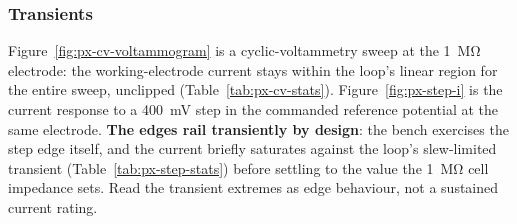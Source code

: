 %

\subsubsection{Transients}\label{sss:pixel-transient}

Figure~\ref{fig:px-cv-voltammogram} is a cyclic-voltammetry sweep at the
\SI{1}{\mega\ohm} electrode: the working-electrode current stays within the
loop's linear region for the entire sweep, unclipped
(Table~\ref{tab:px-cv-stats}). Figure~\ref{fig:px-step-i} is the current
response to a \SI{400}{\milli\volt} step in the commanded reference potential
at the same electrode. \textbf{The edges rail transiently by design}: the
bench exercises the step edge itself, and the current briefly saturates
against the loop's slew-limited transient (Table~\ref{tab:px-step-stats})
before settling to the value the \SI{1}{\mega\ohm} cell impedance sets. Read
the transient extremes as edge behaviour, not a sustained current rating.
